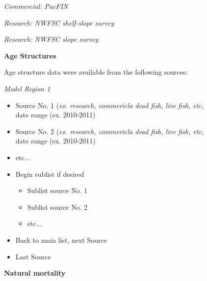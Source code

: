 \documentclass[12pt,]{article}
\begin{document}
\emph{Commercial: PacFIN}

\emph{Research: NWFSC shelf-slope survey}

\emph{Research: NWFSC slope survey}

\vspace{.5cm} \textbf{Age Structures}

Age structure data were available from the following sources:

\emph{Model Region 1}

\begin{itemize}[noitemsep,nolistsep,topsep=0pt]
  \item Source No. 1 (\emph{ex. research, commericla dead fish, live fish, etc},\\ 
        date range (ex. 2010-2011)
  \item Source No. 2 (\emph{ex. research, commericla dead fish, live fish, etc},\\
        date range (ex. 2010-2011) 
  \item etc...      
  \item Begin sublist if desired 
    \begin{itemize}[noitemsep,nolistsep]
      \item Sublist source No. 1     
      \item Sublist source No. 2        
      \item etc...     
    \end{itemize}
  \item Back to main list, next Source     
  \item Last Source     
\end{itemize}

\vspace{.5cm}

\textbf{Natural mortality}
\end{document}
